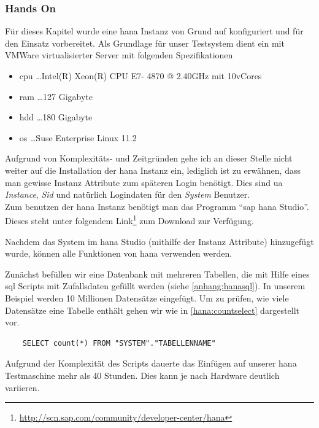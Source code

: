 \subsubsection{Hands On}
\label{sec:db-hana-ho}
Für dieses Kapitel wurde eine \gls{hana} Instanz von Grund auf konfiguriert und für den Einsatz vorbereitet. 
Als Grundlage für unser Testsystem dient ein mit VMWare virtualisierter Server mit folgenden Spezifikationen
\begin{itemize}
	\item \gls{cpu} \ldots Intel(R) Xeon(R) CPU E7- 4870  @ 2.40GHz mit 10vCores
	\item \gls{ram} \ldots 127 Gigabyte
	\item \gls{hdd} \ldots 180 Gigabyte
	\item \gls{os} \ldots Suse Enterprise Linux 11.2	
\end{itemize}

Aufgrund von Komplexitäts- und Zeitgründen gehe ich an dieser Stelle nicht weiter auf die Installation der \gls{hana} Instanz ein, lediglich ist zu erwähnen, dass man gewisse Instanz Attribute zum späteren Login benötigt. Dies sind \gls{ua} \emph{Instance}, \emph{Sid} und natürlich Logindaten für den \emph{System} Benutzer.\\
Zum benutzen der \gls{hana} Instanz benötigt man das Programm "`\gls{sap} \gls{hana} Studio"'. Dieses steht unter folgendem Link\footnote{\url{http://scn.sap.com/community/developer-center/hana}} zum Download zur Verfügung.

Nachdem das System im \gls{hana} Studio (mithilfe der Instanz Attribute) hinzugefügt wurde, können alle Funktionen von \gls{hana} verwenden werden.

Zunächst befüllen wir eine Datenbank mit mehreren Tabellen, die mit Hilfe eines \gls{sql} Scripts mit Zufallsdaten gefüllt werden (siehe \ref{anhang:hanasql}). In unserem Beispiel werden 10 Millionen Datensätze eingefügt. Um zu prüfen, wie viele Datensätze eine Tabelle enthält gehen wir wie in \ref{hana:countselect} dargestellt vor.

\begin{lstlisting}
	SELECT count(*) FROM "SYSTEM"."TABELLENNAME"
\end{lstlisting}

Aufgrund der Komplexität des Scripts dauerte das Einfügen auf unserer \gls{hana} Testmaschine mehr als 40 Stunden. Dies kann je nach Hardware deutlich variieren.\\

